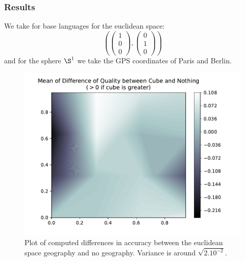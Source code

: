 \documentclass[ratio=169]{beamercours}
\begin{document}
\begin{frame}[allowframebreaks]
	\frametitle{Results}
	We take for base languages for the euclidean space:
	\begin{equation*}
		\left( \begin{pmatrix}
	1\\
	0\\
	0
\end{pmatrix}, \begin{pmatrix}
	0\\
	1\\
	0
\end{pmatrix}\right)
	\end{equation*}
	and for the sphere $\S^{1}$ we take the GPS coordinates of Paris and Berlin.

	\framebreak

\begin{figure}[H]
	\centering
	\hfill
	\includegraphics[width=\textwidth]{../Figures/qual_diff_cube_none}
	\caption{Plot of computed differences in accuracy between the euclidean space geography and no geography. Variance is around $\sqrt{2.10^{-2}}$.}
	\label{cubenone}
\end{figure}

	\framebreak



\end{frame}
\end{document}
